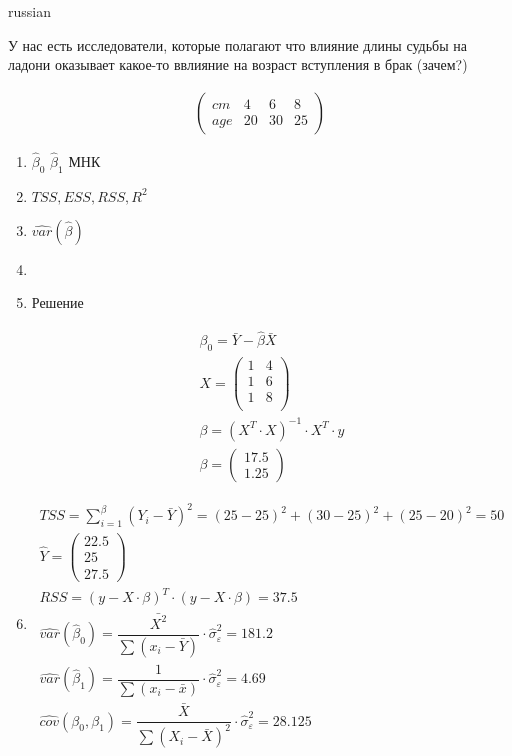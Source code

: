 \documentclass{article}
\begin{document}
\begin{otherlanguage*}{russian}
\begin{enumerate}
У нас есть исследователи, которые полагают что влияние длины судьбы на ладони оказывает какое-то ввлияние на возраст вступления в брак  (зачем?) 

\begin{align*}
\begin{pmatrix}
cm & 4 & 6 & 8 \\
age & 20 & 30 & 25 
\end{pmatrix}
\end{align*}

\begin{enumerate}
\item $ \hat \beta_0$ $ \hat \beta_1 $ МНК 

\item $ TSS, ESS , RSS, R^2 $ 

\item $ \widehat{var} ( \hat \beta )  $ 

\item 


\item Решение  

\begin{align*}
\beta_0 = \bar{Y} - \hat \beta \bar{X} \\ 
X = \begin{pmatrix}
1 & 4 \\
1 & 6 \\
1 & 8 \\
\end{pmatrix} \\
\beta = (X^T \cdot X) ^ {-1} \cdot X^T \cdot y \\
\beta = \begin{pmatrix}
17.5 \\ 1.25
\end{pmatrix}
\end{align*}

\item 

\begin{align*}
TSS = \sum_{i=1}^\beta (Y_i - \bar{Y})^ 2 = (25 - 25)^ 2 + (30 - 25) ^ 2 + (25 - 20) ^ 2 = 50 \\
\hat{Y} = \begin{pmatrix}
22.5 \\ 25 \\ 27.5 
\end{pmatrix} \\
RSS = (y - X \cdot \beta)^T \cdot (y - X \cdot \beta) = 37.5 \\
\widehat{var} (\hat \beta_0) = \dfrac{\bar{X^2}}{\sum (x_i - \bar{Y})} \cdot \hat \sigma^2_{\varepsilon} = 181.2 \\ 
\widehat{var} (\hat \beta_1) = \dfrac{1}{\sum (x_i - \bar{x})} \cdot \hat \sigma^2_{\varepsilon} = 4.69 \\ 
\widehat{cov} (\beta_0, \beta_1) = \dfrac{\bar{X}}{\sum (X_i - \bar{X})^2} \cdot \hat \sigma_{\varepsilon}^ 2 = 28.125  
\end{align*}


\end{enumerate}
\end{enumerate}
\end{otherlanguage*}
\end{document}
